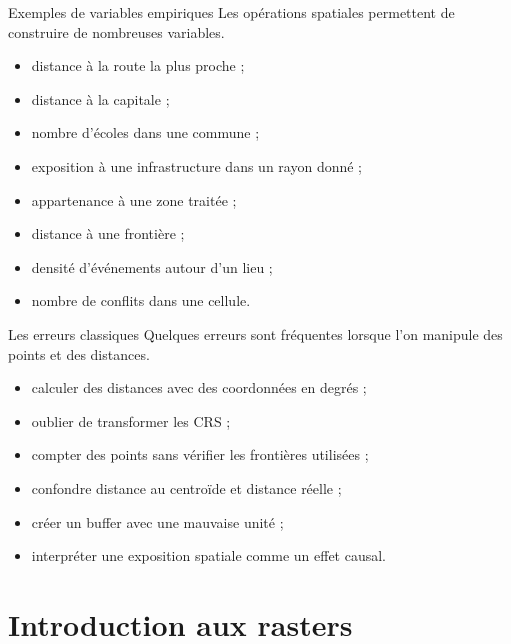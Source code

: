 \documentclass[
  10pt,
  ignorenonframetext,
]{beamer}
\begin{document}
\begin{frame}{Exemples de variables empiriques}
\label{exemples-de-variables-empiriques}
Les opérations spatiales permettent de construire de nombreuses
variables.

\begin{itemize}
  \item distance à la route la plus proche ;
  \item distance à la capitale ;
  \item nombre d’écoles dans une commune ;
  \item exposition à une infrastructure dans un rayon donné ;
  \item appartenance à une zone traitée ;
  \item distance à une frontière ;
  \item densité d’événements autour d’un lieu ;
  \item nombre de conflits dans une cellule.
\end{itemize}
\end{frame}

\begin{frame}{Les erreurs classiques}
\label{les-erreurs-classiques}
Quelques erreurs sont fréquentes lorsque l'on manipule des points et des
distances.

\begin{itemize}
  \item calculer des distances avec des coordonnées en degrés ;
  \item oublier de transformer les CRS ;
  \item compter des points sans vérifier les frontières utilisées ;
  \item confondre distance au centroïde et distance réelle ;
  \item créer un buffer avec une mauvaise unité ;
  \item interpréter une exposition spatiale comme un effet causal.
\end{itemize}
\end{frame}

\section{Introduction aux rasters}\label{introduction-aux-rasters}
\end{document}
